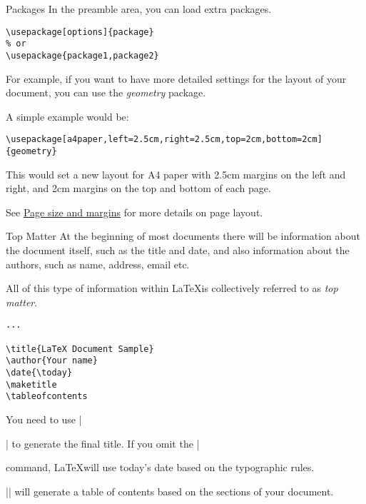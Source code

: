 \begin{frame}[fragile]{Packages}
    In the preamble area, you can load extra packages.

    \begin{command}
        \begin{verbatim}
\usepackage[options]{package}
% or
\usepackage{package1,package2}
        \end{verbatim}
    \end{command}
    \pause
    For example, if you want to have more detailed settings for the layout of your document, you can use the \textit{geometry} package.

    \pause
    
    A simple example would be:

    \begin{command}
        \begin{verbatim}
\usepackage[a4paper,left=2.5cm,right=2.5cm,top=2cm,bottom=2cm]{geometry}
        \end{verbatim}
    \end{command}

    This would set a new layout for A4 paper with 2.5cm margins on the left and right, and 2cm margins on the top and bottom of each page.

    \pause

    See \href{https://www.overleaf.com/learn/latex/Page_size_and_margins}{Page size and margins} for more details on page layout.
\end{frame}

\begin{frame}[fragile]{Top Matter}
    At the beginning of most documents there will be information about the document itself, such as the title and date, and also information about the authors, such as name, address, email etc.

    All of this type of information within \LaTeX is collectively referred to as \textit{top matter}.

    \pause

    \begin{command}
        \begin{verbatim}
...

\title{LaTeX Document Sample}
\author{Your name}
\date{\today}
\maketitle
\tableofcontents

        \end{verbatim}
    \end{command}

    \pause
    You need to use \LC|\maketitle| to generate the final title. If you omit the \LC|\date| command, \LaTeX will use today's date based on the typographic rules.

    \pause
    \LC|\tableofcontents| will generate a table of contents based on the sections of your document.
\end{frame}

